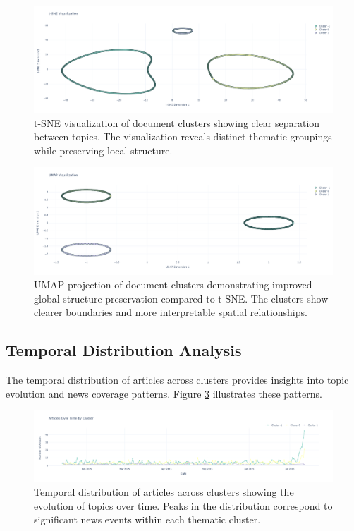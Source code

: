 \documentclass[conference]{IEEEtran}
\begin{document}
\begin{figure}[!t]
\centering
\includegraphics[width=\columnwidth]{images/t-sne}
\caption{t-SNE visualization of document clusters showing clear separation between topics. The visualization reveals distinct thematic groupings while preserving local structure.}
\label{fig:tsne}
\end{figure}

\begin{figure}[!t]
\centering
\includegraphics[width=\columnwidth]{images/umap}
\caption{UMAP projection of document clusters demonstrating improved global structure preservation compared to t-SNE. The clusters show clearer boundaries and more interpretable spatial relationships.}
\label{fig:umap}
\end{figure}

\subsection{Temporal Distribution Analysis}
The temporal distribution of articles across clusters provides insights into topic evolution and news coverage patterns. Figure \ref{fig:temporal} illustrates these patterns.

\begin{figure}[!t]
\centering
\includegraphics[width=\columnwidth]{images/temporal_distribution}
\caption{Temporal distribution of articles across clusters showing the evolution of topics over time. Peaks in the distribution correspond to significant news events within each thematic cluster.}
\label{fig:temporal}
\end{figure}
\end{document}
